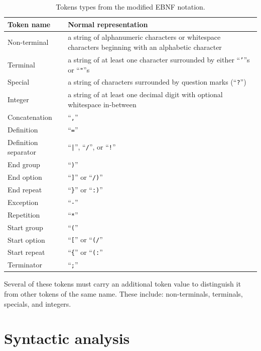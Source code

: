 \documentclass[english,bachelors,forcepolishlogotype]{wizthesis}
\begin{document}
\begin{longtable}[c]{@{}lm{9cm}@{}}
  \caption{Tokens types from the modified EBNF notation.}
  \label{tab:tokens}\\
  \toprule
  Token name           & Normal representation \\* \midrule
  \endfirsthead
  \endhead
  \endfoot
  \endlastfoot
  Non-terminal         & a string of alphanumeric characters or whitespace
  characters beginning with an alphabetic character \\
  Terminal             & a string of at least one character surrounded by either
  ``\texttt{'}''s or ``\texttt{"}''s \\
  Special              & a string of characters surrounded by question marks
  (``\texttt{?}'') \\
  Integer              & a string of at least one decimal digit with optional
  whitespace in-between \\
  Concatenation        & ``\texttt{,}'' \\
  Definition           & ``\texttt{=}'' \\
  Definition separator & ``\texttt{|}'', ``\texttt{/}'', or ``\texttt{!}'' \\
  End group            & ``\texttt{)}'' \\
  End option           & ``\texttt{]}'' or ``\texttt{/)}'' \\
  End repeat           & ``\texttt{\}}'' or ``\texttt{:)}'' \\
  Exception            & ``\texttt{-}'' \\
  Repetition           & ``\texttt{*}'' \\
  Start group          & ``\texttt{(}'' \\
  Start option         & ``\texttt{[}'' or ``\texttt{(/}'' \\
  Start repeat         & ``\texttt{\{}'' or ``\texttt{(:}'' \\
  Terminator           & ``\texttt{;}'' \\* \bottomrule
\end{longtable}

Several of these tokens must carry an additional token value to distinguish it
from other tokens of the same name. These include: non-terminals, terminals,
specials, and integers.

\section{Syntactic analysis} \label{sec:parsing}
\end{document}
